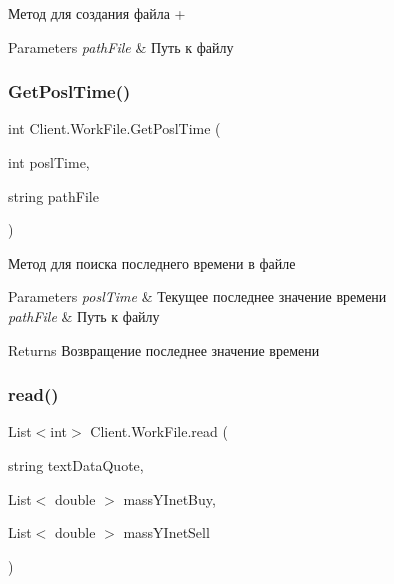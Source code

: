 Метод для создания файла + 


\begin{DoxyParams}{Parameters}
{\em path\+File} & Путь к файлу \\
\hline
\end{DoxyParams}
\hypertarget{class_client_1_1_work_file_aa6be3320b601af43b26ad4ad964cdc4f}{}\label{class_client_1_1_work_file_aa6be3320b601af43b26ad4ad964cdc4f} 
\subsubsection{\texorpdfstring{Get\+Posl\+Time()}{GetPoslTime()}}
{\footnotesize\ttfamily int Client.\+Work\+File.\+Get\+Posl\+Time (\begin{DoxyParamCaption}\item[{int}]{posl\+Time,  }\item[{string}]{path\+File }\end{DoxyParamCaption})\hspace{0.3cm}{\ttfamily [inline]}}



Метод для поиска последнего времени в файле 


\begin{DoxyParams}{Parameters}
{\em posl\+Time} & Текущее последнее значение времени\\
\hline
{\em path\+File} & Путь к файлу \\
\hline
\end{DoxyParams}
\begin{DoxyReturn}{Returns}
Возвращение последнее значение времени
\end{DoxyReturn}
\hypertarget{class_client_1_1_work_file_a98c27a5faa8b82ec7f64c9368d54c19a}{}\label{class_client_1_1_work_file_a98c27a5faa8b82ec7f64c9368d54c19a} 
\subsubsection{\texorpdfstring{read()}{read()}}
{\footnotesize\ttfamily List$<$int$>$ Client.\+Work\+File.\+read (\begin{DoxyParamCaption}\item[{string}]{text\+Data\+Quote,  }\item[{List$<$ double $>$}]{mass\+Y\+Inet\+Buy,  }\item[{List$<$ double $>$}]{mass\+Y\+Inet\+Sell }\end{DoxyParamCaption})\hspace{0.3cm}{\ttfamily [inline]}}



